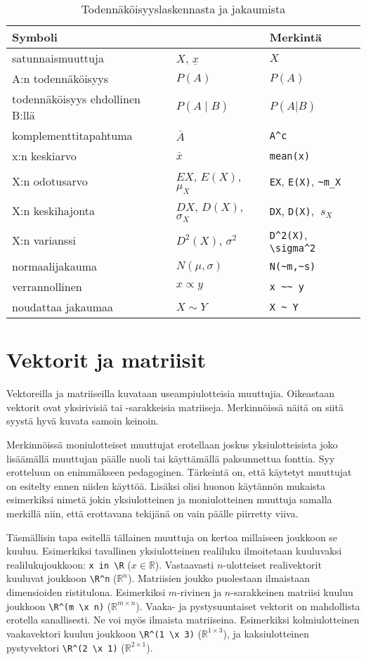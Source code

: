 \begin{table}[ht]
\begin{tabular}{ ll|l }
\multicolumn{2}{l}{Symboli} & Merkintä \\ \hline
satunnaismuuttuja & $X$, $\underline{x}$ & $X$ \\
A:n todennäköisyys & $P(A)$ & $P(A)$ \\
todennäköisyys ehdollinen B:llä & $P(A \mid B)$ & $P(A | B)$ \\
komplementtitapahtuma & $\bar{A}$ & \verb$A^c$ \\
x:n keskiarvo & $\bar{x}$ & \verb$mean(x)$ \\
X:n odotusarvo & $EX$, $E(X)$, $\mu_X$ & \verb$EX$, \verb$E(X)$, \verb$~m_X$ \\
X:n keskihajonta & $DX$, $D(X)$, $\sigma_X$ & \verb$DX$, \verb$D(X)$, $~s_X$ \\
X:n varianssi & $D^2(X)$, $\sigma^2$ & \verb$D^2(X)$, \verb$\sigma^2$ \\
normaalijakauma & $N(\mu,\sigma)$ & \verb$N(~m,~s)$ \\
verrannollinen & $x\propto y$ & \verb$x ~~ y$ \\
noudattaa jakaumaa & $X\sim Y$ & \verb$X ~ Y$ \\
\end{tabular}
\caption{Todennäköisyyslaskennasta ja jakaumista}
\label{tbl:prob}
\end{table}

\FloatBarrier

\section{Vektorit ja matriisit}
Vektoreilla ja matriiseilla kuvataan useampiulotteisia muuttujia. 
Oikeastaan vektorit ovat yksirivisiä tai -sarakkeisia matriiseja.
Merkinnöissä näitä on siitä syystä hyvä kuvata samoin keinoin.

Merkinnöissä moniulotteiset muuttujat erotellaan joskus yksiulotteisista joko lisäämällä muuttujan 
päälle nuoli tai käyttämällä paksunnettua fonttia. 
Syy erotteluun on enimmäkseen pedagoginen. Tärkeintä on, että käytetyt muuttujat on esitelty ennen niiden käyttöä. Lisäksi olisi huonon käytännön mukaista 
esimerkiksi nimetä jokin yksiulotteinen ja moniulotteinen muuttuja samalla merkillä niin, että erottavana tekijänä on vain päälle piirretty viiva.

Täsmällisin tapa esitellä tällainen muuttuja on kertoa millaiseen joukkoon se kuuluu. Esimerkiksi tavallinen yksiulotteinen realiluku ilmoitetaan kuuluvaksi 
realilukujoukkoon: \verb$x in \R$ ($x\in \mathbb{R}$). Vastaavasti $n$-ulotteiset realivektorit kuuluvat joukkoon \verb$\R^n$ ($\mathbb{R}^n$).  
Matriisien joukko puolestaan ilmaistaan dimensioiden ristitulona. 
Esimerkiksi $m$-rivinen ja $n$-sarakkeinen matriisi kuuluu joukkoon \verb$\R^(m \x n)$ ($\mathbb{R}^{m \times n}$).
Vaaka- ja pystysuuntaiset vektorit on mahdollista erotella sanallisesti.
Ne voi myös ilmaista matriiseina. 
Esimerkiksi kolmiulotteinen vaakavektori kuuluu joukkoon \verb$\R^(1 \x 3)$ ($\mathbb{R}^{1\times 3}$), ja kaksiulotteinen pystyvektori \verb$\R^(2 \x 1)$ 
($\mathbb{R}^{2\times 1}$).

